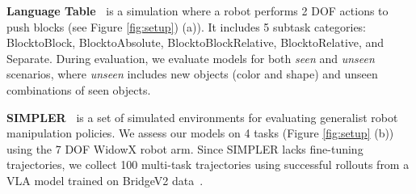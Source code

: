 \documentclass{article} %
\begin{document}
\textbf{Language Table~\citep{lynch2022interactivelanguagetalkingrobots}} is a simulation where a robot performs 2 DOF actions to push blocks (see Figure \ref{fig:setup}) (a)). It includes 5 subtask categories: BlocktoBlock, BlocktoAbsolute, BlocktoBlockRelative, BlocktoRelative, and Separate. 
During evaluation, we evaluate models for both \textit{seen} and \textit{unseen} scenarios, where \textit{unseen} includes new objects (color and shape) and unseen combinations of seen objects. 

\textbf{SIMPLER~\citep{li2024evaluatingrealworldrobotmanipulation}} is a set of simulated environments for evaluating generalist robot manipulation policies. We assess our models on 4 tasks (Figure \ref{fig:setup} (b)) using the 7 DOF WidowX robot arm. 
Since SIMPLER lacks fine-tuning trajectories, we collect 100 multi-task trajectories using successful rollouts from a VLA model trained on BridgeV2 data~\citep{walke2023bridgedata}.
\end{document}

